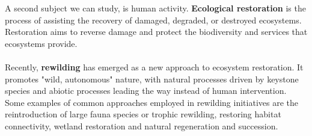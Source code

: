 \documentclass[../summary.tex]{subfiles}
\begin{document}
	\newpage
	A second subject we can study, is human activity. \textbf{Ecological restoration} is the process of assisting the recovery of damaged, degraded, or destroyed ecosystems. Restoration aims to reverse damage and protect the biodiversity and services that ecosystems provide.
	\\
	\\
	Recently, \textbf{rewilding} has emerged as a new approach to ecosystem restoration. It promotes "wild, autonomous" nature, with natural processes driven by keystone species and abiotic processes leading the way instead of human intervention. Some examples of common approaches employed in rewilding initiatives are the reintroduction of large fauna species or trophic rewilding, restoring habitat connectivity, wetland restoration and natural regeneration and succession. 
	
\end{document}
